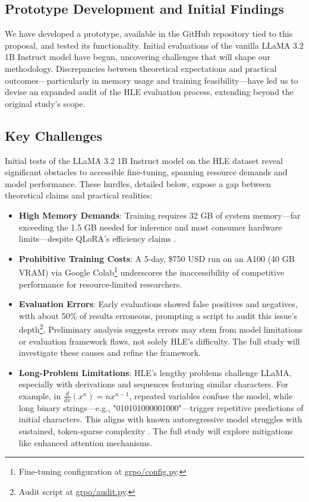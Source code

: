 \documentclass{svproc}
\begin{document}
\subsection{Prototype Development and Initial Findings}

We have developed a prototype, available in the GitHub repository tied to this proposal, and tested its functionality. Initial evaluations of the vanilla LLaMA 3.2 1B Instruct model have begun, uncovering challenges that will shape our methodology. Discrepancies between theoretical expectations and practical outcomes—particularly in memory usage and training feasibility—have led us to devise an expanded audit of the HLE evaluation process, extending beyond the original study’s scope.

\subsection{Key Challenges}

Initial tests of the LLaMA 3.2 1B Instruct model on the HLE dataset reveal significant obstacles to accessible fine-tuning, spanning resource demands and model performance. These hurdles, detailed below, expose a gap between theoretical claims and practical realities:

\begin{itemize}
  \item \textbf{High Memory Demands}: Training requires 32 GB of system memory—far exceeding the 1.5 GB needed for inference and most consumer hardware limits—despite QLoRA’s efficiency claims \cite{dettmers2023qloraefficientfinetuningquantized}.
  \item \textbf{Prohibitive Training Costs}: A 5-day, \$750 USD run on an A100 (40 GB VRAM) via Google Colab\footnote{Fine-tuning configuration at \href{https://github.com/pre63/quantized-optimization-of-mathematical-reasoning-study/blob/main/pilot/grpo/config.py}{grpo/config.py}.} underscores the inaccessibility of competitive performance for resource-limited researchers.
  \item \textbf{Evaluation Errors}: Early evaluations showed false positives and negatives, with about 50\% of results erroneous, prompting a script to audit this issue’s depth\footnote{Audit script at \href{https://github.com/pre63/quantized-optimization-of-mathematical-reasoning-study/blob/main/pilot/grpo/audit.py}{grpo/audit.py}.}. Preliminary analysis suggests errors may stem from model limitations or evaluation framework flaws, not solely HLE’s difficulty. The full study will investigate these causes and refine the framework.
  \item \textbf{Long-Problem Limitations}: HLE’s lengthy problems challenge LLaMA, especially with derivations and sequences featuring similar characters. For example, in \(\frac{d}{dx} (x^n) = nx^{n-1}\), repeated variables confuse the model, while long binary strings—e.g., "010101000001000"—trigger repetitive predictions of initial characters. This aligns with known autoregressive model struggles with sustained, token-sparse complexity \cite{vaswani2023attentionneed}. The full study will explore mitigations like enhanced attention mechanisms.
\end{itemize}
\end{document}
